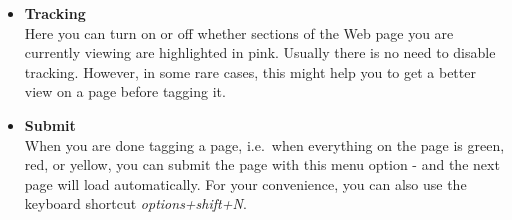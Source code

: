 \documentclass[12pt]{article}
\begin{document}
\begin{itemize}
	\item {\large \textbf{Tracking}}\\
Here you can turn on or off whether sections of the Web page you are currently viewing are highlighted in pink. Usually there is no need to disable tracking. However, in some rare cases, this might help you to get a better view on a page before tagging it. \\
	\item {\large \textbf{Submit}}\\
When you are done tagging a page, i.e.~when everything on the page is green, red, or yellow, you can submit the page with this menu option - and the next page will load automatically. For your convenience, you can also use the keyboard shortcut \emph{options+shift+N}. \\


\end{itemize}
\end{document}
